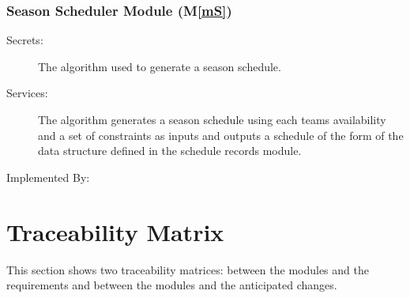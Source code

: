 \documentclass[12pt, titlepage]{article}
\newcommand{\mref}[1]{M\ref{#1}}
\begin{document}
\subsubsection{Season Scheduler Module (\mref{mS})}

\begin{description}
  \item[Secrets:]The algorithm used to generate a season schedule.
  \item[Services:]The algorithm generates a season schedule using each teams
  availability and a set of constraints as inputs and outputs a schedule of
  the form of the data structure defined in the schedule records module.
  \item[Implemented By:] \progname{}
\end{description}

\section{Traceability Matrix} \label{SecTM}

This section shows two traceability matrices: between the modules and the
requirements and between the modules and the anticipated changes.
\end{document}
